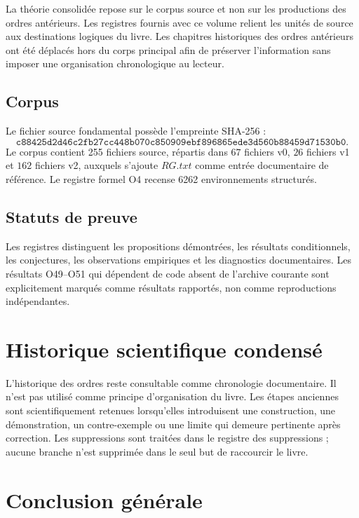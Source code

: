 \documentclass[11pt,a4paper,openany]{book}
\begin{document}
La théorie consolidée repose sur le corpus source et non sur les productions des ordres antérieurs. Les registres fournis avec ce volume relient les unités de source aux destinations logiques du livre. Les chapitres historiques des ordres antérieurs ont été déplacés hors du corps principal afin de préserver l'information sans imposer une organisation chronologique au lecteur.

\section{Corpus}
Le fichier source fondamental possède l'empreinte SHA-256 :
\[
\texttt{c88425d2d46c2fb27cc448b070c850909ebf896865ede3d560b88459d71530b0}.
\]
Le corpus contient 255 fichiers source, répartis dans $67$ fichiers v0, $26$ fichiers v1 et $162$ fichiers v2, auxquels s'ajoute $RG.txt$ comme entrée documentaire de référence. Le registre formel O4 recense 6262 environnements structurés.

\section{Statuts de preuve}
Les registres distinguent les propositions démontrées, les résultats conditionnels, les conjectures, les observations empiriques et les diagnostics documentaires. Les résultats O49--O51 qui dépendent de code absent de l'archive courante sont explicitement marqués comme résultats rapportés, non comme reproductions indépendantes.


\chapter{Historique scientifique condensé}

L'historique des ordres reste consultable comme chronologie documentaire. Il n'est pas utilisé comme principe d'organisation du livre. Les étapes anciennes sont scientifiquement retenues lorsqu'elles introduisent une construction, une démonstration, un contre-exemple ou une limite qui demeure pertinente après correction. Les suppressions sont traitées dans le registre des suppressions ; aucune branche n'est supprimée dans le seul but de raccourcir le livre.


\backmatter

\chapter*{Conclusion générale}
\end{document}
